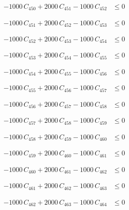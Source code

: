 \documentclass[a4paper,11pt]{article}
\begin{document}
\begin{align}
-1000\,C_{450} + 2000\,C_{451} - 1000\,C_{452} &\leq 0 \nonumber
\end{align}

\begin{align}
-1000\,C_{451} + 2000\,C_{452} - 1000\,C_{453} &\leq 0 \nonumber
\end{align}

\begin{align}
-1000\,C_{452} + 2000\,C_{453} - 1000\,C_{454} &\leq 0 \nonumber
\end{align}

\begin{align}
-1000\,C_{453} + 2000\,C_{454} - 1000\,C_{455} &\leq 0 \nonumber
\end{align}

\begin{align}
-1000\,C_{454} + 2000\,C_{455} - 1000\,C_{456} &\leq 0 \nonumber
\end{align}

\begin{align}
-1000\,C_{455} + 2000\,C_{456} - 1000\,C_{457} &\leq 0 \nonumber
\end{align}

\begin{align}
-1000\,C_{456} + 2000\,C_{457} - 1000\,C_{458} &\leq 0 \nonumber
\end{align}

\begin{align}
-1000\,C_{457} + 2000\,C_{458} - 1000\,C_{459} &\leq 0 \nonumber
\end{align}

\begin{align}
-1000\,C_{458} + 2000\,C_{459} - 1000\,C_{460} &\leq 0 \nonumber
\end{align}

\begin{align}
-1000\,C_{459} + 2000\,C_{460} - 1000\,C_{461} &\leq 0 \nonumber
\end{align}

\begin{align}
-1000\,C_{460} + 2000\,C_{461} - 1000\,C_{462} &\leq 0 \nonumber
\end{align}

\begin{align}
-1000\,C_{461} + 2000\,C_{462} - 1000\,C_{463} &\leq 0 \nonumber
\end{align}

\begin{align}
-1000\,C_{462} + 2000\,C_{463} - 1000\,C_{464} &\leq 0 \nonumber
\end{align}
\end{document}

